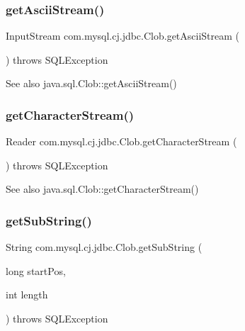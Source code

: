 \subsubsection{\texorpdfstring{get\+Ascii\+Stream()}{getAsciiStream()}}
{\footnotesize\ttfamily Input\+Stream com.\+mysql.\+cj.\+jdbc.\+Clob.\+get\+Ascii\+Stream (\begin{DoxyParamCaption}{ }\end{DoxyParamCaption}) throws S\+Q\+L\+Exception}

\begin{DoxySeeAlso}{See also}
java.\+sql.\+Clob\+::get\+Ascii\+Stream() 
\end{DoxySeeAlso}
\mbox{\label{classcom_1_1mysql_1_1cj_1_1jdbc_1_1_clob_a2257c466b89e944490f677dfdfc3dbe4}} 
\subsubsection{\texorpdfstring{get\+Character\+Stream()}{getCharacterStream()}}
{\footnotesize\ttfamily Reader com.\+mysql.\+cj.\+jdbc.\+Clob.\+get\+Character\+Stream (\begin{DoxyParamCaption}{ }\end{DoxyParamCaption}) throws S\+Q\+L\+Exception}

\begin{DoxySeeAlso}{See also}
java.\+sql.\+Clob\+::get\+Character\+Stream() 
\end{DoxySeeAlso}
\mbox{\label{classcom_1_1mysql_1_1cj_1_1jdbc_1_1_clob_a6329527c580f97eb9ad48187443b2134}} 
\subsubsection{\texorpdfstring{get\+Sub\+String()}{getSubString()}}
{\footnotesize\ttfamily String com.\+mysql.\+cj.\+jdbc.\+Clob.\+get\+Sub\+String (\begin{DoxyParamCaption}\item[{long}]{start\+Pos,  }\item[{int}]{length }\end{DoxyParamCaption}) throws S\+Q\+L\+Exception}

